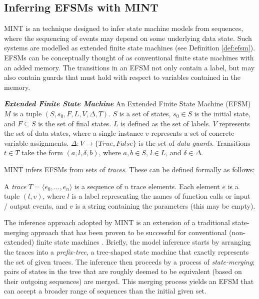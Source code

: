 \documentclass{llncs}
\begin{document}
\subsection{Inferring EFSMs with MINT}
\label{sub:inferringEfsms}
MINT \cite{WalkinshawWCRE} is an technique designed to infer state machine models from sequences, where the sequencing of events may depend on some underlying data state. Such systems are modelled as extended finite state machines (see Definition \ref{def:efsm}). EFSMs can be conceptually thought of as conventional finite state machines with an added memory. The transitions in an EFSM not only contain a label, but may also contain guards that must hold with respect to variables contained in the memory.

\begin{definition}\textbf{\emph{Extended Finite State Machine}}
\label{def:efsm}
 An Extended Finite State Machine (EFSM) $M$ is a tuple $(S,s_0,F,L,V,\Delta,T)$. $S$ is a set of states, $s_0 \in S$ is the initial state, and $F \subseteq S$ is the set of final states. $L$ is defined as the set of labels. $V$ represents the set of data states, where a single instance $v$ represents a set of concrete variable assignments. $\Delta:V \rightarrow \{True,False\}$ is the set of \emph{data guards}. Transitions $t \in T$ take the form $(a,l,\delta,b)$, where $a,b \in S$, $l \in L$, and $\delta \in \Delta$. 
\end{definition}

MINT infers EFSMs from sets of \emph{traces}. These can be defined formally as follows:

\begin{definition}
\label{def:traces}
A \emph{trace} $T=\langle e_0,\ldots,e_n\rangle$ is a sequence of $n$ trace elements. Each element $e$ is a tuple $(l,v)$, where $l$ is a label representing the names of function calls or input / output events, and $v$ is a string containing the parameters (this may be empty).
\end{definition}

The inference approach adopted by MINT \cite{WalkinshawWCRE} is an extension of a traditional state-merging approach \cite{Lang1998} that has been proven to be successful for conventional (non-extended) finite state machines \cite{WalkinshawStamina}. Briefly, the model inference starts by arranging the traces into a \emph{prefix-tree}, a tree-shaped state machine that exactly represents the set of given traces. The inference then proceeds by a process of \emph{state-merging}; pairs of states in the tree that are roughly deemed to be equivalent (based on their outgoing sequences) are merged. This merging process yields an EFSM that can accept a broader range of sequences than the initial given set.
\end{document}
